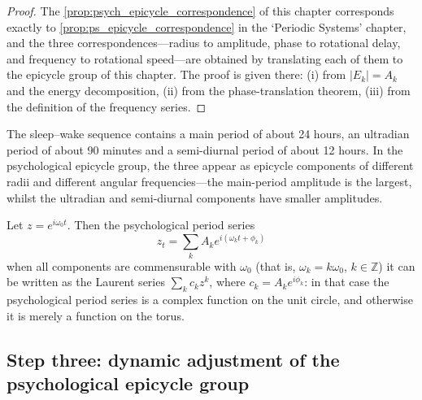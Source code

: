 \begin{proof}
The \cref{prop:psych_epicycle_correspondence} of this chapter corresponds exactly to \cref{prop:ps_epicycle_correspondence} in the `Periodic Systems' chapter,
and the three correspondences---radius to amplitude, phase to rotational delay, and frequency to rotational speed---are obtained by translating each of them to the epicycle group of this chapter.
The proof is given there: (i) from $|E_k|=A_k$ and the energy decomposition, (ii) from the phase-translation theorem, (iii) from the definition of the frequency series.
\end{proof}

\begin{example}\label{ex:psych_sleep_series}
The sleep--wake sequence contains a main period of about 24 hours, an ultradian period of about 90 minutes and a semi-diurnal period of about 12 hours. In the psychological epicycle group, the three appear as epicycle components of different radii and different angular frequencies---the main-period amplitude is the largest, whilst the ultradian and semi-diurnal components have smaller amplitudes.
\end{example}

\begin{remark}\label{rem:psych_series_complex}
Let $z=e^{i\omega_0t}$. Then the psychological period series
\[
z_t=\sum_k A_k e^{i(\omega_k t+\phi_k)}
\]
when all components are commensurable with $\omega_0$ (that is, $\omega_k=k\omega_0$, $k\in\mathbb Z$) it can be written as the Laurent series $\sum_k c_k z^k$, where $c_k=A_k e^{i\phi_k}$: in that case the psychological period series is a complex function on the unit circle, and otherwise it is merely a function on the torus.
\end{remark}

\subsection{Step three: dynamic adjustment of the psychological epicycle group}

